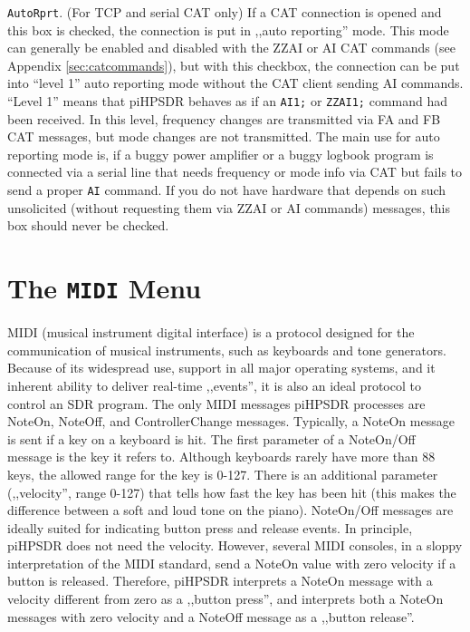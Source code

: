 \documentclass[12pt]{book}
\def\rett#1{\texttt{\color{red}#1}}
\def\pH{pi\-HPSDR\xspace}
\begin{document}
\rett{AutoRprt}. (For TCP and serial CAT only)
If a CAT connection is opened and this box is checked,
the connection is put in ,,auto reporting'' mode. This mode can generally be enabled and disabled with the
ZZAI or AI CAT commands (see Appendix \ref{sec:catcommands}), but with this checkbox, the connection can be put
into ``level 1'' auto reporting mode without the CAT client sending AI commands. ``Level 1'' means that \pH
behaves as if an \texttt{AI1;} or \texttt{ZZAI1;} command had been received. In this level, frequency changes
are transmitted via FA and FB CAT messages, but mode changes are not transmitted.
The main use for auto reporting mode is, if a buggy power amplifier or a buggy logbook program
is connected via a serial line that needs frequency or mode  info via CAT but fails to send a proper
\texttt{AI} command.  If you do not have hardware that depends
on such unsolicited (without requesting them via ZZAI or AI commands) messages, this box should never be checked.



\section{The \texttt{MIDI} Menu}
\label{sec:midimenu}
MIDI (musical instrument digital interface) is a protocol designed for the communication of
musical instruments, such as keyboards and tone generators. Because of its widespread use,
support in all major operating systems, and it inherent ability to deliver real-time ,,events'',
it is also an ideal protocol to control an SDR program. The only MIDI messages \pH processes
are NoteOn, NoteOff, and ControllerChange messages. Typically, a NoteOn message is sent if
a key on a keyboard is hit. The first parameter of a NoteOn/Off message is the key
it refers to. Although keyboards rarely have more than 88 keys, the allowed range for
the key is 0-127. There is an additional parameter (,,velocity'', range 0-127) that tells how
fast the key has been hit (this makes the difference between a soft and loud tone on the piano).
NoteOn/Off messages are ideally suited for indicating button press and release events. In principle,
\pH does not need the velocity. However, several MIDI consoles, in a sloppy interpretation of
the MIDI standard, send a NoteOn value with zero velocity if a button is released. Therefore,
\pH interprets a NoteOn message with a velocity different from zero as a ,,button press'',
and interprets both a NoteOn messages with zero velocity and a NoteOff message as a ,,button release''.
\end{document}
